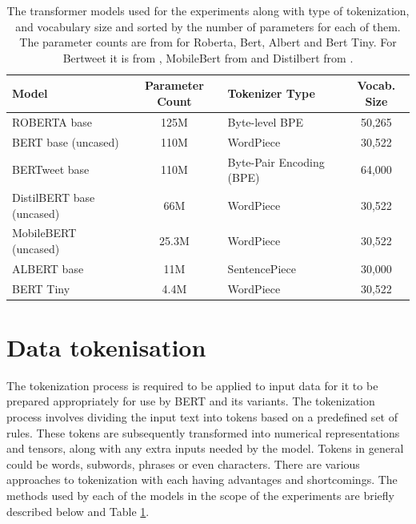 \begin{table}[ht]
    \captionsetup{font=small}
    \centering
    \begin{tabularx}{\textwidth}{|l|c|X|c|}
        \hline
        \rowcolor[gray]{0.7}
        \textbf{Model}            & \textbf{Parameter Count} & \textbf{Tokenizer Type} & \textbf{Vocab. Size} \\
        \hline
        ROBERTA base              & 125M                     & Byte-level BPE          & 50,265                \\
        \hline
        BERT base (uncased)       & 110M                     & WordPiece               & 30,522                \\
        \hline
        BERTweet base             & 110M                     & Byte-Pair Encoding (BPE)      & 64,000                \\
        \hline
        DistilBERT base (uncased) & 66M                      & WordPiece               & 30,522                \\
        \hline
        MobileBERT (uncased)      & 25.3M                    & WordPiece               & 30,522                \\
        \hline
        ALBERT base               & 11M                      & SentencePiece           & 30,000                \\
        \hline
        BERT Tiny                 & 4.4M                     & WordPiece               & 30,522                \\
        \hline
    \end{tabularx}
    \caption{The transformer models used for the experiments along with type of tokenization, and vocabulary size and sorted by the number of parameters for each of them. The parameter counts are from \cite{bhargavaGeneralizationNLIWays2021} for Roberta, Bert, Albert and Bert Tiny. For Bertweet it is from \cite{nguyenBERTweetPretrainedLanguage2020}, MobileBert from \cite{sunMobileBERTCompactTaskAgnostic2020} and Distilbert from \cite{sanhDistilBERTDistilledVersion2020}.}
    \label{tab: model_dtls}
\end{table}

\section{Data tokenisation}
The tokenization process is required to be applied to input data for it to be prepared appropriately for use by BERT and its variants. The tokenization process involves dividing the input text into tokens based on a predefined set of rules. These tokens are subsequently transformed into numerical representations and tensors, along with any extra inputs needed by the model. Tokens in general could be words, subwords, phrases or even characters. There are various approaches to tokenization with each having advantages and shortcomings. The methods used by each of the models in the scope of the experiments are briefly described below and Table \ref{tab: model_dtls}.
\newline \newline
